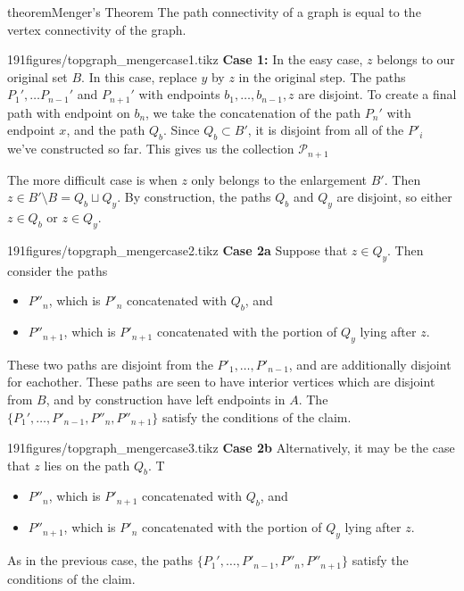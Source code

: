 \begin{doubledpage}{theorem}{Menger's Theorem}{
	The path connectivity of a graph is equal to the vertex connectivity of the graph.  }
\begin{paragraphfigureenv}{191figures/topgraph_mengercase1.tikz}
    \textbf{Case 1:} In the easy case, $z$ belongs to our original set $B$. In this case, replace $y$ by $z$ in the original step. The paths $P_1', \ldots P_{n-1}'$ and $P_{n+1}'$ with endpoints $b_1, \ldots, b_{n-1}, z$ are disjoint. To create a final path with endpoint on $b_n$, we take the concatenation of the path $P_{n}'$ with endpoint $x$, and the path $Q_b$. Since $Q_b\subset B'$, it is disjoint from all of the $P'_i$ we've constructed so far. This gives us the collection $\mathcal P_{n+1}$ 
\end{paragraphfigureenv}
The more difficult case is when  $z$ only belongs to the enlargement  $B'$. Then $z\in B'\setminus B = Q_b\sqcup Q_y$. By construction, the paths $Q_b$ and $Q_y$ are disjoint, so either $z\in Q_b$ or $z\in Q_y$. 
\begin{paragraphfigureenv}{191figures/topgraph_mengercase2.tikz} \textbf{Case 2a}
    Suppose that $z\in Q_y$. Then consider the paths 
    \begin{itemize}
        \item $P''_n$, which is $P'_n$ concatenated with $Q_b$, and 
        \item $P''_{n+1}$, which is $P'_{n+1}$ concatenated with the portion of $Q_y$ lying after $z$. 
    \end{itemize} 
    These two paths are disjoint from the $P'_1, \ldots, P'_{n-1}$, and are additionally disjoint for eachother. These paths are seen to have interior vertices which are disjoint from $B$, and by construction have left endpoints in $A$. The $\{P_1', \ldots, P'_{n-1}, P''_n, P''_{n+1}\}$ satisfy the conditions of the claim. 
\end{paragraphfigureenv}

\begin{paragraphfigureenv}{191figures/topgraph_mengercase3.tikz}
    \textbf{Case 2b}
     Alternatively, it may be the case that $z$ lies on the path $Q_b$. T
     \begin{itemize}
         \item $P''_n$, which is $P'_{n+1}$ concatenated with $Q_b$, and 
         \item $P''_{n+1}$, which is $P'_{n}$ concatenated with the portion of $Q_y$ lying after $z$. 
     \end{itemize}  
     As in the previous case, the paths $\{P_1', \ldots, P'_{n-1}, P''_n, P''_{n+1}\}$ satisfy the conditions of the claim.
\end{paragraphfigureenv} 
\end{doubledpage}